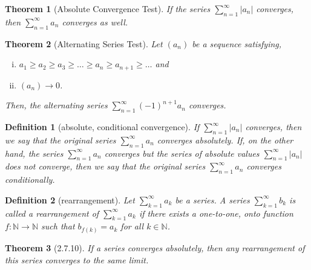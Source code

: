 \documentclass{article}
\newtheorem{definition}{Definition}
\newtheorem{theorem}{Theorem}
\begin{document}
\begin{theorem}[Absolute Convergence Test]
    If the series $\sum _{n=1}^\infty |a_n|$ converges, then $\sum _{n=1}^\infty a_n$ converges as well.
\end{theorem}

\begin{theorem}[Alternating Series Test]
    Let $(a_n)$ be a sequence satisfying,
    \begin{enumerate}[(i)]
        \item $a_1 \geq a_2 \geq a_3 \geq \dots \geq a_n \geq a_{n+1} \geq \dots$ and
        \item $(a_n)\rightarrow 0$.
    \end{enumerate}
    Then, the alternating series $\sum _{n = 1}^\infty (-1)^{n+1}a_n$ converges.
\end{theorem}

\begin{definition}[absolute, conditional convergence]
    If $\sum _{n = 1}^\infty |a_n|$ converges, then we say that the original series $\sum _{n=1}^\infty a_n$ converges absolutely. If, on the other hand, the series $\sum _{n=1}^\infty a_n$ converges but the series of absolute values $\sum _{n=1}^\infty |a_n|$ does not converge, then we say that the original series $\sum _{n=1}^\infty a_n$ converges conditionally.
\end{definition}

\begin{definition}[rearrangement]
    Let $\sum _{k=1}^\infty a_k$ be a series. A series $\sum _{k=1}^\infty b_k$ is called a \textit{rearrangement} of $\sum _{k=1}^\infty a_k$ if there exists a one-to-one, onto function $f:\mathbb{N} \rightarrow \mathbb{N}$ such that $b_{f(k)}=a_k$ for all $k \in \mathbb{N}$.
\end{definition}

\begin{theorem}[2.7.10]
    If a series converges absolutely, then any rearrangement of this series converges to the same limit.
\end{theorem}
\end{document}
